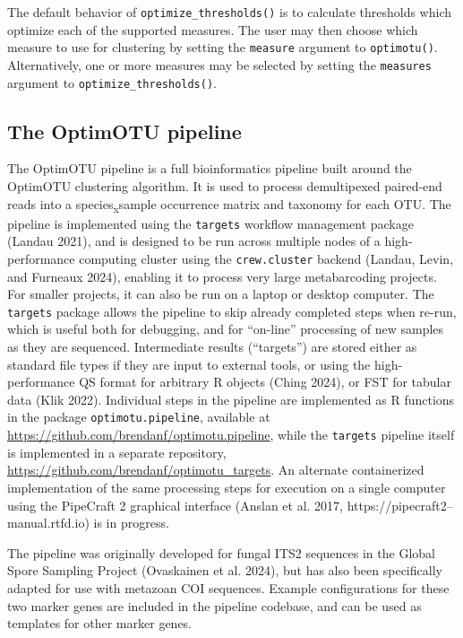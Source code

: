 \documentclass[
]{article}
\begin{document}
The default behavior of \texttt{optimize\_thresholds()} is to calculate thresholds which optimize each of the supported measures.
The user may then choose which measure to use for clustering by setting the \texttt{measure} argument to \texttt{optimotu()}.
Alternatively, one or more measures may be selected by setting the \texttt{measures} argument to \texttt{optimize\_thresholds()}.

\subsection{The OptimOTU pipeline}\label{the-optimotu-pipeline}

The OptimOTU pipeline is a full bioinformatics pipeline built around the OptimOTU clustering algorithm.
It is used to process demultipexed paired-end reads into a species\textsubscript{x}sample occurrence matrix and taxonomy for each OTU.
The pipeline is implemented using the \texttt{targets} workflow management package (Landau 2021), and is designed to be run across multiple nodes of a high-performance computing cluster using the \texttt{crew.cluster} backend (Landau, Levin, and Furneaux 2024), enabling it to process very large metabarcoding projects.
For smaller projects, it can also be run on a laptop or desktop computer.
The \texttt{targets} package allows the pipeline to skip already completed steps when re-run, which is useful both for debugging, and for ``on-line'' processing of new samples as they are sequenced.
Intermediate results (``targets'') are stored either as standard file types if they are input to external tools, or using the high-performance QS format for arbitrary R objects (Ching 2024), or FST for tabular data (Klik 2022).
Individual steps in the pipeline are implemented as R functions in the package \texttt{optimotu.pipeline}, available at \url{https://github.com/brendanf/optimotu.pipeline}, while the \texttt{targets} pipeline itself is implemented in a separate repository, \url{https://github.com/brendanf/optimotu_targets}.
An alternate containerized implementation of the same processing steps for execution on a single computer using the PipeCraft 2 graphical interface (Anslan et al. 2017, https://pipecraft2--manual.rtfd.io) is in progress.

The pipeline was originally developed for fungal ITS2 sequences in the Global Spore Sampling Project (Ovaskainen et al. 2024), but has also been specifically adapted for use with metazoan COI sequences.
Example configurations for these two marker genes are included in the pipeline codebase, and can be used as templates for other marker genes.
\end{document}
